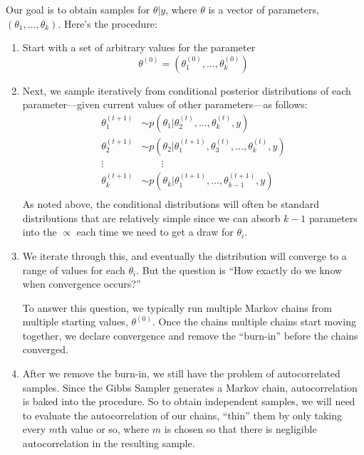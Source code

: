 \documentclass[a4paper,12pt]{scrartcl}
\begin{document}
Our goal is to obtain samples for $\theta | y$, where $\theta$ 
is a vector of parameters, $(\theta_1, \ldots, \theta_k)$. Here's
the procedure:
\begin{enumerate}
   \item Start with a set of arbitrary values for the parameter 
      \[ \theta^{(0)} = (\theta_1^{(0)}, \ldots,  \theta_k^{(0)}) \]
   \item Next, we sample iteratively from conditional posterior 
      distributions of each parameter---given current values of
      other parameters---as follows:
      \begin{align*}
	 \theta_1^{(t+1)} &\sim p(\theta_1 | 
	    \theta_2^{(t)}, \ldots,  \theta_k^{(t)}, y)\\
	 \theta_2^{(t+1)} &\sim p(\theta_2 | 
	    \theta_1^{(t+1)},\theta_3^{(t)},\ldots,\theta_k^{(t)}, y)\\
	 \vdots \quad & \qquad \vdots \\
	 \theta_k^{(t+1)} &\sim p(\theta_k | 
	    \theta_1^{(t+1)},\ldots, \theta_{k-1}^{(t+1)}, y)\\
      \end{align*}
      As noted above, the conditional distributions will often be 
      standard distributions that are relatively simple since we
      can absorb $k-1$ parameters into the $\propto$ each time
      we need to get a draw for $\theta_i$.
   \item We iterate through this, and eventually the distribution will
      converge to a range of values for each $\theta_i$. But
      the question is ``How exactly do we know when convergence
      occurs?'' 
      
      To answer this question, we typically run multiple
      Markov chains from multiple starting values, $\theta^{(0)}$.
      Once the chains multiple chains start moving together, we declare
      convergence and remove the ``burn-in'' before the chains 
      converged.
   \item After we remove the burn-in, we still have the problem of
      autocorrelated samples.  Since the Gibbs Sampler generates
      a Markov chain, autocorrelation is baked into the procedure.
      So to obtain independent samples, we will need to evaluate the
      autocorrelation of our chains, ``thin'' them by only taking
      every $m$th value or so, where $m$ is chosen so that 
      there is negligible autocorrelation in the resulting sample.
\end{enumerate}
\end{document}

